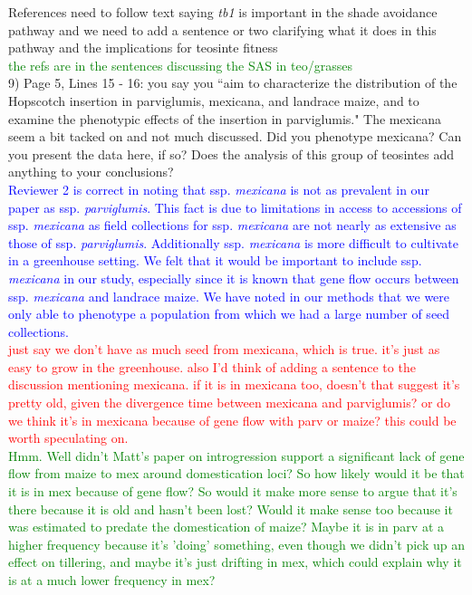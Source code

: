 \documentclass[11pt]{article}
\newcommand{\res}[1]{\noindent \textcolor{blue}{{#1}} \\}
\newcommand{\jri}[1]{\noindent \textcolor{red}{{#1}} \\}
\newcommand{\lev}[1]{\noindent \textcolor{green}{{#1}} \\}
\newcommand{\mbh}[1]{\noindent \textcolor{Dandelion}{{#1}}\\}
\begin{document}
\mbh{References need to follow text saying \emph{tb1} is important in the shade avoidance pathway and we need to add a sentence or two clarifying what it does in this pathway and the implications for teosinte fitness} \lev{the refs are in the sentences discussing the SAS in teo/grasses}

9) Page 5, Lines 15 - 16: you say you ``aim to characterize the distribution of the Hopscotch insertion in parviglumis, mexicana, and landrace maize, and to examine the phenotypic effects of the insertion in parviglumis."  The mexicana seem a bit tacked on and not much discussed. Did you phenotype mexicana? Can you present the data here, if so? Does the analysis of this group of teosintes add anything to your conclusions?\\

\res{Reviewer 2 is correct in noting that ssp. \emph{mexicana} is not as prevalent in our paper as ssp. \emph{parviglumis}. This fact is due to limitations in access to accessions of ssp. \emph{mexicana} as field collections for ssp. \emph{mexicana} are not nearly as extensive as those of ssp. \emph{parviglumis}. Additionally ssp. \emph{mexicana} is more difficult to cultivate in a greenhouse setting. We felt that it would be important to include ssp. \emph{mexicana} in our study, especially since it is known that gene flow occurs between ssp. \emph{mexicana} and landrace maize. We have noted in our methods that we were only able to phenotype a population from which we had a large number of seed collections.} \jri{just say we don't have as much seed from mexicana, which is true. it's just as easy to grow in the greenhouse. also I'd think of adding a sentence to the discussion mentioning mexicana. if it is in mexicana too, doesn't that suggest it's pretty old, given the divergence time between mexicana and parviglumis? or do we think it's in mexicana because of gene flow with parv or maize? this could be worth speculating on.}
\lev{Hmm. Well didn't Matt's paper on introgression support a significant lack of gene flow from maize to mex around domestication loci? So how likely would it be that it is in mex because of gene flow? So would it make more sense to argue that it's there because it is old and hasn't been lost? Would it make sense too because it was estimated to predate the domestication of maize? Maybe it is in parv at a higher frequency because it's 'doing' something, even though we didn't pick up an effect on tillering, and maybe it's just drifting in mex, which could explain why it is at a much lower frequency in mex?}
\end{document}
